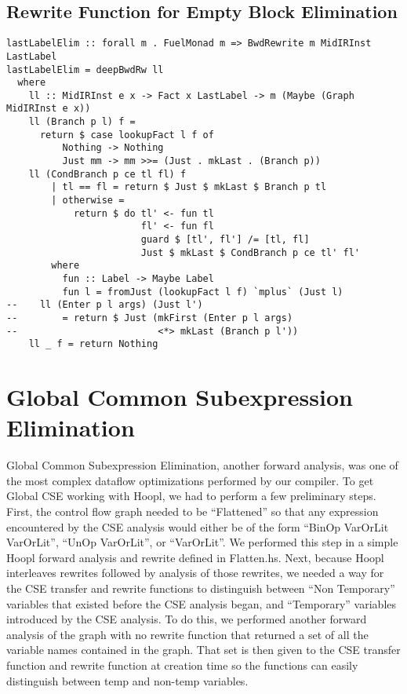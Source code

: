 \documentclass[11pt]{article}
\begin{document}
\subsection{Rewrite Function for Empty Block Elimination}

\begin{verbatim}
lastLabelElim :: forall m . FuelMonad m => BwdRewrite m MidIRInst LastLabel
lastLabelElim = deepBwdRw ll
  where
    ll :: MidIRInst e x -> Fact x LastLabel -> m (Maybe (Graph MidIRInst e x))
    ll (Branch p l) f = 
      return $ case lookupFact l f of
          Nothing -> Nothing
          Just mm -> mm >>= (Just . mkLast . (Branch p))
    ll (CondBranch p ce tl fl) f
        | tl == fl = return $ Just $ mkLast $ Branch p tl
        | otherwise =
            return $ do tl' <- fun tl
                        fl' <- fun fl
                        guard $ [tl', fl'] /= [tl, fl]
                        Just $ mkLast $ CondBranch p ce tl' fl'
        where
          fun :: Label -> Maybe Label
          fun l = fromJust (lookupFact l f) `mplus` (Just l)
--    ll (Enter p l args) (Just l')
--        = return $ Just (mkFirst (Enter p l args)
--                         <*> mkLast (Branch p l'))
    ll _ f = return Nothing
\end{verbatim}

\section {Global Common Subexpression Elimination} 
\label{sec:cse}

Global Common Subexpression Elimination, another forward analysis, was one of the most complex dataflow optimizations performed by our compiler. To get Global CSE working with Hoopl, we had to perform a few preliminary steps. First, the control flow graph needed to be ``Flattened'' so that any expression encountered by the CSE analysis would either be of the form ``BinOp VarOrLit VarOrLit'', ``UnOp VarOrLit'', or ``VarOrLit''. We performed this step in a simple Hoopl forward analysis and rewrite defined in Flatten.hs. Next, because Hoopl interleaves rewrites followed by analysis of those rewrites, we needed a way for the CSE transfer and rewrite functions to distinguish between ``Non Temporary'' variables that existed before the CSE analysis began, and ``Temporary'' variables introduced by the CSE analysis. To do this, we performed another forward analysis of the graph with no rewrite function that returned a set of all the variable names contained in the graph. That set is then given to the CSE transfer function and rewrite function at creation time so the functions can easily distinguish between temp and non-temp variables. 
\end{document}
